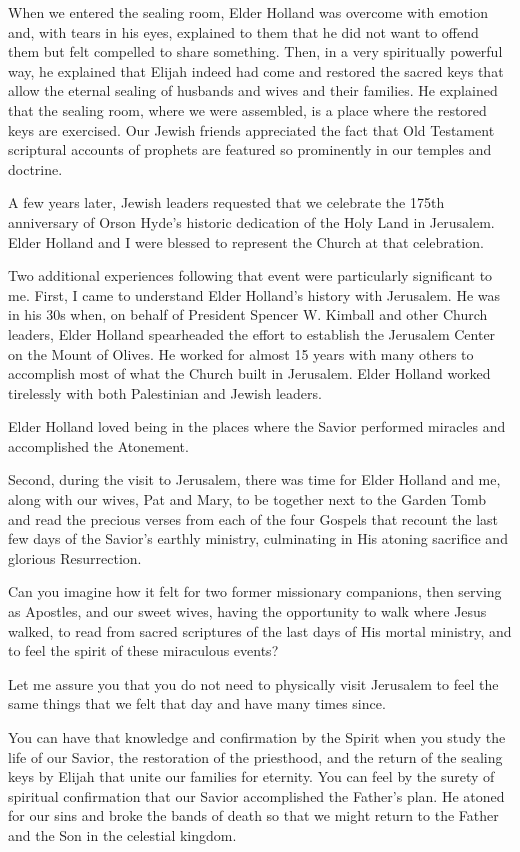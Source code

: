 \documentclass[letterpaper, 11pt]{report}
\begin{document}
When we entered the sealing room, Elder Holland was overcome with emotion and, with tears in his eyes, explained to them that he did not want to offend them but felt compelled to share something. Then, in a very spiritually powerful way, he explained that Elijah indeed had come and restored the sacred keys that allow the eternal sealing of husbands and wives and their families. He explained that the sealing room, where we were assembled, is a place where the restored keys are exercised. Our Jewish friends appreciated the fact that Old Testament scriptural accounts of prophets are featured so prominently in our temples and doctrine.

A few years later, Jewish leaders requested that we celebrate the 175th anniversary of Orson Hyde’s historic dedication of the Holy Land in Jerusalem. Elder Holland and I were blessed to represent the Church at that celebration.

Two additional experiences following that event were particularly significant to me. First, I came to understand Elder Holland’s history with Jerusalem. He was in his 30s when, on behalf of President Spencer W. Kimball and other Church leaders, Elder Holland spearheaded the effort to establish the Jerusalem Center on the Mount of Olives. He worked for almost 15 years with many others to accomplish most of what the Church built in Jerusalem. Elder Holland worked tirelessly with both Palestinian and Jewish leaders.

Elder Holland loved being in the places where the Savior performed miracles and accomplished the Atonement.

Second, during the visit to Jerusalem, there was time for Elder Holland and me, along with our wives, Pat and Mary, to be together next to the Garden Tomb and read the precious verses from each of the four Gospels that recount the last few days of the Savior’s earthly ministry, culminating in His atoning sacrifice and glorious Resurrection.

Can you imagine how it felt for two former missionary companions, then serving as Apostles, and our sweet wives, having the opportunity to walk where Jesus walked, to read from sacred scriptures of the last days of His mortal ministry, and to feel the spirit of these miraculous events?

Let me assure you that you do not need to physically visit Jerusalem to feel the same things that we felt that day and have many times since.

You can have that knowledge and confirmation by the Spirit when you study the life of our Savior, the restoration of the priesthood, and the return of the sealing keys by Elijah that unite our families for eternity. You can feel by the surety of spiritual confirmation that our Savior accomplished the Father’s plan. He atoned for our sins and broke the bands of death so that we might return to the Father and the Son in the celestial kingdom.
\end{document}
